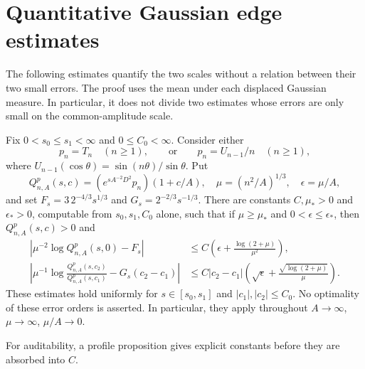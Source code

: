 \section{Quantitative Gaussian edge estimates}\label{sec:quantitative-edge}

The following estimates quantify the two scales without a relation between
their two small errors.  The proof uses the mean under each displaced
Gaussian measure.  In particular, it does not divide two estimates whose
errors are only small on the common-amplitude scale.

\begin{theorem}
\label{thm:quantitative-edge}
Fix $0<s_0\le s_1<\infty$ and $0\le C_0<\infty$.  Consider either
\[
 p_n=T_n\quad(n\ge1),\qquad\text{or}\qquad
 p_n=U_{n-1}/n\quad(n\ge1),
\]
where $U_{n-1}(\cos\theta)=\sin(n\theta)/\sin\theta$.
Put
\[
 Q^p_{n,A}(s,c)=(e^{sA^{-2}D^2}p_n)(1+c/A),\quad
 \mu=(n^2/A)^{1/3},\quad \epsilon=\mu/A,
\]
and set $F_s=3\,2^{-4/3}s^{1/3}$ and
$G_s=2^{-2/3}s^{-1/3}$.
There are constants $C,\mu_*>0$ and $\epsilon_*>0$, computable from
$s_0,s_1,C_0$ alone, such that if $\mu\ge\mu_*$ and
$0<\epsilon\le\epsilon_*$, then $Q^p_{n,A}(s,c)>0$ and
\begin{align}
 \left|\mu^{-2}\log Q^p_{n,A}(s,0)-F_s\right|
 &\le C\left(\epsilon+
             \frac{\log(2+\mu)}{\mu^2}\right),
 \label{eq:quantitative-amplitude}\\
 \left|\mu^{-1}\log\frac{Q^p_{n,A}(s,c_2)}{Q^p_{n,A}(s,c_1)}
                -G_s(c_2-c_1)\right|
 &\le C|c_2-c_1|\left(\sqrt\epsilon+
             \frac{\sqrt{\log(2+\mu)}}\mu\right).
 \label{eq:quantitative-tilt}
\end{align}
These estimates hold uniformly for $s\in[s_0,s_1]$ and
$|c_1|,|c_2|\le C_0$.  No optimality of these error orders is asserted.
In particular, they apply throughout $A\to\infty$, $\mu\to\infty$,
$\mu/A\to0$.
\end{theorem}

For auditability, a profile proposition gives explicit constants before
they are absorbed into $C$.

